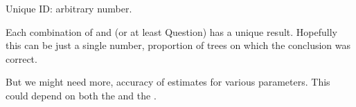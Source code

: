Unique ID: arbitrary number.

Each combination of \Method and \Task (or at least Question) has a unique \Performance result.
Hopefully this can be just a single number, \eg proportion of trees on which the conclusion was correct.

But we might need more, \eg accuracy of estimates for various parameters.
This could depend on both the \Method and the \Question.

% 
% 
% 
% 
% 

